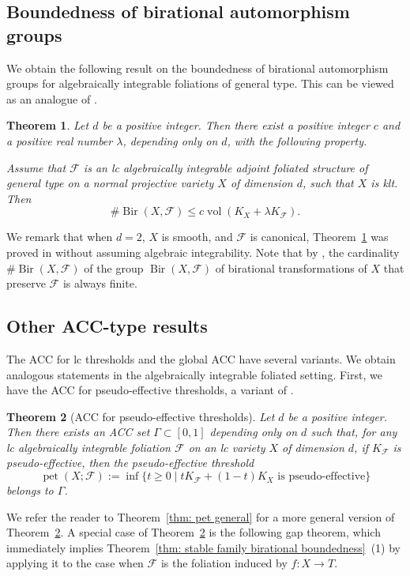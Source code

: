 \documentclass[11pt,reqno]{amsart}
\numberwithin{equation}{section}
\newcommand{\vol}{\operatorname{vol}}
\newcommand{\Bir}{\operatorname{Bir}}
\newcommand{\pet}{\operatorname{pet}}
\newcommand{\Ff}{\mathcal{F}}
\newcommand{\Ii}{\Gamma}
\newtheorem{thm}{Theorem}[section]
\theoremstyle{definition}
\begin{document}
\subsection*{Boundedness of birational automorphism groups} We obtain the following result on the boundedness of birational automorphism groups for algebraically integrable foliations of general type. This can be viewed as an analogue of \cite[Theorem~1.1]{HMX13}. 

\begin{thm}\label{thm: bir auto group afs main}
    Let $d$ be a positive integer. Then there exist a positive integer $c$ and a positive real number $\lambda$, depending only on $d$, with the following property.

 Assume that $\Ff$ is an lc algebraically integrable adjoint foliated structure of general type on a normal projective variety $X$ of dimension $d$, such that $X$ is klt. Then
    $$\#\Bir(X,\Ff)\leq c\vol\left(K_X+\lambda K_{\Ff}\right).$$
\end{thm}

We remark that when $d=2$, $X$ is smooth, and $\Ff$ is canonical, Theorem~\ref{thm: bir auto group afs main} was proved in \cite[Theorem~1.6]{SS23} without assuming algebraic integrability. Note that by \cite[Theorem~F]{BPRT22}, the cardinality $\#\Bir(X,\Ff)$ of the group
$\Bir(X,\Ff)$
of birational transformations of $X$ that preserve $\Ff$ is always finite. 

\subsection*{Other ACC-type results} The ACC for lc thresholds and the global ACC have several variants. We obtain analogous statements in the algebraically integrable foliated setting. First, we have the ACC for pseudo-effective thresholds, a variant of \cite[Theorem~1.6]{DC16}.

\begin{thm}[ACC for pseudo-effective thresholds]\label{thm: pet main}
    Let $d$ be a positive integer. Then there exists an ACC set $\Ii\subset [0,1]$ depending only on $d$ such that, for any lc algebraically integrable foliation $\Ff$ on an lc variety $X$ of dimension $d$, if $K_{\Ff}$ is pseudo-effective, then the pseudo-effective threshold
    $$\pet(X;\Ff):=\inf\{t\geq 0\mid tK_{\Ff}+(1-t)K_X\text{ is pseudo-effective}\}$$
    belongs to $\Ii$.
\end{thm}

We refer the reader to Theorem~\ref{thm: pet general} for a more general version of Theorem~\ref{thm: pet main}. A special case of Theorem~\ref{thm: pet main} is the following gap theorem, which immediately implies Theorem~\ref{thm: stable family birational boundedness}~(1) by applying it to the case when $\Ff$ is the foliation induced by $f\colon X\to T$.
\end{document}
